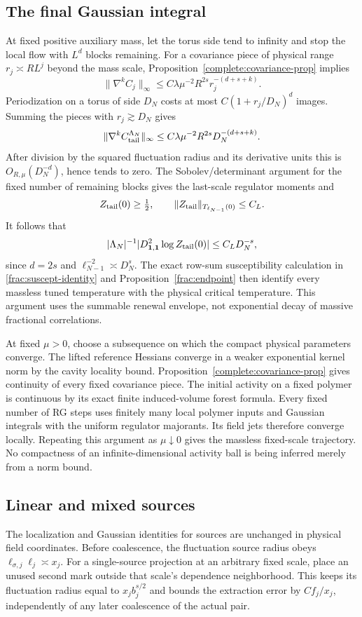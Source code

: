 \documentclass[11pt]{article}
\begin{document}
\subsection{The final Gaussian integral}
At fixed positive auxiliary mass, let the torus side tend to infinity
and stop the local flow with \(L^d\) blocks remaining. For a covariance
piece of physical range \(r_j\asymp RL^j\) beyond the mass scale,
Proposition~\ref{complete:covariance-prop} implies
\[
 \|\nabla^k C_j\|_\infty
       \le C\lambda\mu^{-2}R^{2s}r_j^{-(d+s+k)}.
\]
Periodization on a torus of side \(D_N\) costs at most
\(C(1+r_j/D_N)^d\) images. Summing the pieces with
\(r_j\gtrsim D_N\) gives
\[
 \|\nabla^k C_{\rm tail}^{\Lambda_N}\|_\infty
       \le C\lambda\mu^{-2}R^{2s}D_N^{-(d+s+k)}.
\]
After division by the squared fluctuation radius and its derivative
units this is \(O_{R,\mu}(D_N^{-d})\), hence tends to zero.
The Sobolev/determinant argument for the fixed number of remaining
blocks gives the last-scale regulator moments and
\[
 Z_{\rm tail}(0)\ge\tfrac12,\qquad
 \|Z_{\rm tail}\|_{T_{\ell_{N-1}}(0)}\le C_L.
\]
It follows that
\[
 |\Lambda_N|^{-1}
 |D^2_{\boldsymbol1,\boldsymbol1}\log Z_{\rm tail}(0)|
       \le C_LD_N^{-s},
\]
since \(d=2s\) and \(\ell_{N-1}^{-2}\asymp D_N^s\).
The exact row-sum susceptibility calculation in
\eqref{frac:suscept-identity} and Proposition~\ref{frac:endpoint}
then identify every massless tuned temperature with the physical
critical temperature. This argument uses the summable renewal
envelope, not exponential decay of massive fractional correlations.

At fixed \(\mu>0\), choose a subsequence on which the compact physical
parameters converge. The lifted reference Hessians converge in a weaker
exponential kernel norm by the cavity locality bound. Proposition~\ref{complete:covariance-prop}
gives continuity of every fixed covariance piece. The initial activity
on a fixed polymer is continuous by its exact finite induced-volume
forest formula. Every fixed number of RG steps uses finitely many local
polymer inputs and Gaussian integrals with the uniform regulator
majorants. Its field jets therefore converge locally. Repeating this
argument as \(\mu\downarrow0\) gives the massless fixed-scale
trajectory. No compactness of an infinite-dimensional activity ball is
being inferred merely from a norm bound.

\subsection{Linear and mixed sources}
The localization and Gaussian identities for sources are unchanged
in physical field coordinates. Before coalescence, the fluctuation
source radius obeys \(\ell_{\sigma,j}\ell_j\asymp x_j\).
For a single-source projection at an arbitrary fixed scale, place an
unused second mark outside that scale's dependence neighborhood.
This keeps its fluctuation radius equal to \(x_jb_j^{s/2}\) and
bounds the extraction error by \(Cf_j/x_j\), independently of any
later coalescence of the actual pair.
\end{document}
